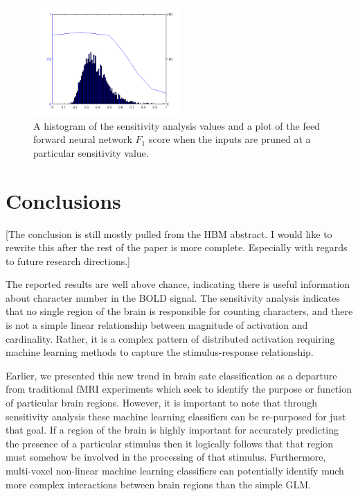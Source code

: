 \documentclass[final]{article}
\begin{document}
\begin{figure}[!htbp]
\centering
\includegraphics[width=0.5\textwidth]{figures/sensitivity-cutoff}
\caption{A histogram of the sensitivity analysis values and a plot of the feed forward neural network $F_1$ score when the inputs are pruned at a particular sensitivity value. }
\label{fig:sensitivity-cutoff}
\end{figure}

\section{Conclusions}
[The conclusion is still mostly pulled from the HBM abstract. I would like to rewrite this after the rest of the paper is more complete. Especially with regards to future research directions.]

The reported results are well above chance, indicating there is useful information about character number in the BOLD signal.
The sensitivity analysis indicates that no single region of the brain is responsible for counting characters, and there is not a simple linear relationship between magnitude of activation and cardinality.
Rather, it is a complex pattern of distributed activation requiring machine learning methods to capture the stimulus-response relationship.

Earlier, we presented this new trend in brain sate classification as a departure from traditional fMRI experiments which seek to identify the purpose or function of particular brain regions.
However, it is important to note that through sensitivity analysis these machine learning classifiers can be re-purposed for just that goal.
If a region of the brain is highly important for accurately predicting the presence of a particular stimulus then it logically follows that that region must somehow be involved in the processing of that stimulus.
Furthermore, multi-voxel non-linear machine learning classifiers can potentially identify much more complex interactions between brain regions than the simple GLM.



\end{document}
